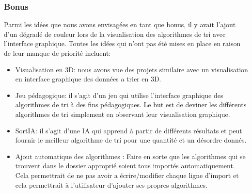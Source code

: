 \documentclass[10pt,a4paper]{article}
\begin{document}
    \subsubsection{Bonus}
    Parmi les idées que nous avons envisagées en tant que bonus, il y avait l'ajout d'un dégradé de couleur lors de la visualisation des algorithmes de tri avec l'interface graphique.
    Toutes les idées qui n'ont pas été mises en place en raison de leur manque de priorité incluent:
     \begin{itemize}  
        \item Visualisation en 3D: nous avons vue des projets similaire avec un visualisation en interface graphique des données a trier en 3D.
        \item Jeu pédagogique: il s'agit d'un jeu qui utilise l'interface graphique des algorithmes de tri à des fins pédagogiques. Le but est de deviner les différents algorithmes de tri simplement en observant leur visualisation graphique. 
        \item SortIA: il s'agit d'une IA qui apprend à partir de différents résultats et peut fournir le meilleur algorithme de tri pour une quantité et un désordre donnés.
        \item Ajout automatique des algorithmes : Faire en sorte que les algorithmes qui se trouvent dans le dossier approprié soient tous importés automatiquement. Cela permettrait de ne pas avoir a écrire/modifier chaque ligne d'import et cela permettrait à l'utilisateur d'ajouter ses propres algorithmes.
    \end{itemize}

\pagebreak
\printbibliography
\newpage
\end{document}
